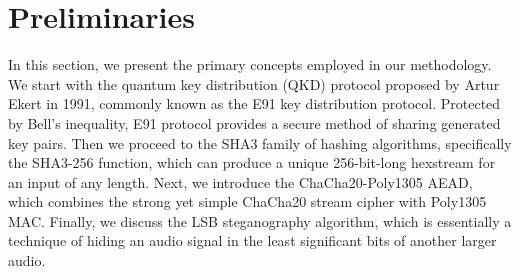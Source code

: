 \documentclass[a4paper]{cas-sc}
\begin{document}
\section{Preliminaries}
\label{sec:preliminaries}
In this section, we present the primary concepts employed in our methodology. We start with the quantum key distribution (QKD) protocol proposed by Artur Ekert in 1991, commonly known as the E91 key distribution protocol. Protected by Bell's inequality, E91 protocol provides a secure method of sharing generated key pairs. Then we proceed to the SHA3 family of hashing algorithms, specifically the SHA3-256 function, which can produce a unique 256-bit-long hexstream for an input of any length. Next, we introduce the ChaCha20-Poly1305 AEAD, which combines the strong yet simple ChaCha20 stream cipher with Poly1305 MAC. Finally, we discuss the LSB steganography algorithm, which is essentially a technique of hiding an audio signal in the least significant bits of another larger audio.
\end{document}
